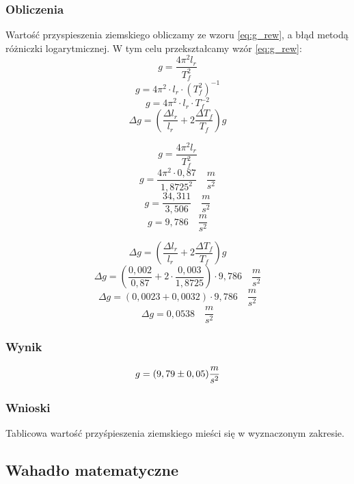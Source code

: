 \documentclass[a4paper, 11pt]{article}
\begin{document}
\subsubsection{Obliczenia}
Wartość przyspieszenia ziemskiego obliczamy ze wzoru \eqref{eq:g_rew},
a błąd metodą różniczki logarytmicznej.
W tym celu przekształcamy wzór \eqref{eq:g_rew}:
\[
	g = \frac{4\pi^2l_r}{T^2_f}
\]
\[
	g = 4\pi^2 \cdot l_r \cdot\left(T^2_f\right)^{-1}
\]
\[
	g = 4\pi^2\cdot l_r \cdot T^{-2}_f
\]
\begin{equation}
	\Delta g = \left( \frac{\Delta l_r}{l_r} +2\frac{\Delta T_f}{T_f} \right)g
\end{equation}

\begin{multicols}{2}
	\[
		g = \frac{4\pi^2l_r}{T^2_f}
	\]
	\[
		g = \frac{4\pi^2 \cdot 0,87}{1,8725^2} \quad \frac{m}{s^2}
	\]
	\[
		g = \frac{34,311}{3,506} \quad\frac{m}{s^2}
	\]
	\[
		g = 9,786 \quad\frac{m}{s^2}
	\]

	\columnbreak

	\[
		\Delta g = \left( \frac{\Delta l_r}{l_r} +2\frac{\Delta T_f}{T_f} \right)g
	\]
	\[
		\Delta g = \left( \frac{0,002}{0,87} +2 \cdot \frac{0,003}{1,8725} \right) \cdot 9,786 \quad \frac{m}{s^2}
	\]
	\[
		\Delta g = \left( 0,0023 + 0,0032 \right) \cdot 9,786 \quad \frac{m}{s^2}
	\]
	\[
		\Delta g = 0,0538 \quad \frac{m}{s^2}
	\]
\end{multicols}

\subsubsection{Wynik}
\begin{equation}
	\huge  g = (9,79 \pm 0,05) \frac{m}{s^2}
\end{equation}


\subsubsection{Wnioski}
Tablicowa wartość przyśpieszenia ziemskiego mieści się w wyznaczonym zakresie.

\subsection{Wahadło matematyczne}
\end{document}
